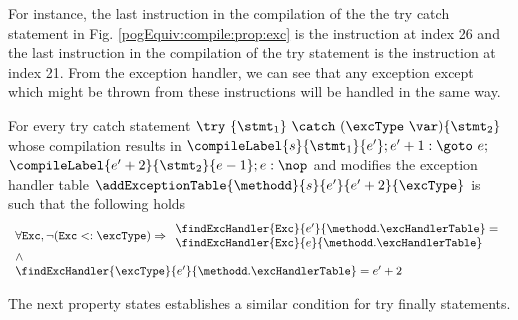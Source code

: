 For instance, the last instruction in the compilation of the the try catch statement  in Fig. \ref{pogEquiv:compile:prop:exc} 
is the instruction at index 26 and the last instruction in the compilation of the try statement is the instruction at index 21. 
From the exception handler, we can see that any exception except \NullPointerExc{} which might be thrown from these instructions 
will be handled in the same way. 
 
\begin{compProp}\label{compile:prop:compProp10}
For every try catch statement $ \try \ \{ \stmt_1 \} \ \catch \ (\excType \ \var )\{ \stmt_2 \}  $ 
whose compilation  results in 
$ \compileLabel{s}{\stmt_1}{e'}; e' + 1: \goto \ e;  $ $\compileLabel{e' + 2 }{\stmt_2}{e - 1}; e: \nop$
and modifies the exception handler table  
	$\addExceptionTable{\methodd}{ s }{ e'  }{ e' + 2 }{\excType} $
is such that the following holds 
$$\begin{array}{l} \forall \mbox{\rm{\texttt{Exc}}},  \neg ( \mbox{\rm{\texttt{Exc}}} <: \excType ) \Rightarrow
  \begin{array}{l}  
         \findExcHandler{\mbox{\rm\tt{Exc}} }{e'}{\methodd.\excHandlerTable} =\\ 
    \findExcHandler{\mbox{\rm\tt{Exc}} }{e}{\methodd.\excHandlerTable}  \\
   \end{array} \\
   \wedge\\
  \findExcHandler{\excType }{e'}{\methodd.\excHandlerTable} = e'+2 \\ 
 \end{array} $$

\end{compProp}

The next property states establishes a similar condition for try finally statements.

